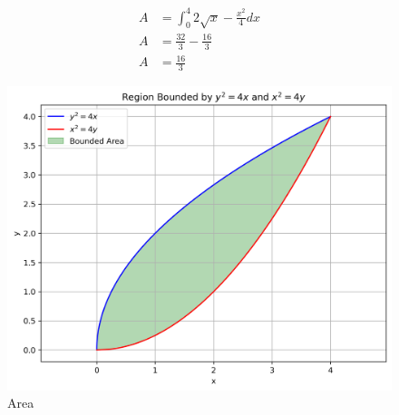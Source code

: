 \documentclass[journal]{IEEEtran}
\begin{document}
\begin{align}
A &= \int_{0}^{4}2\sqrt{x}-\frac{x^2}{4}dx\\
A &= \frac{32}{3}-\frac{16}{3}\\
A &= \frac{16}{3}
\end{align}
\begin{figure}[h!]
    \centering
    \includegraphics[width=0.7\linewidth]{figs/01.png}
    \caption{Area}
    \label{fig:placeholder}
\end{figure}
\end{document}
